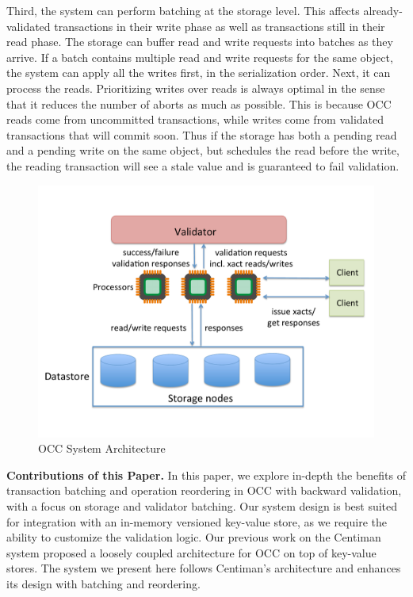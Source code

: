 Third, the system can perform batching at the storage level. This affects already-validated transactions in their write phase as well as transactions still in their read phase. The storage can buffer read and write requests into batches as they arrive. If a batch contains multiple read and write requests for the same object, the system can apply all the writes first, in the serialization order. Next, it can process the reads. Prioritizing writes over reads is always optimal in the sense that it reduces the number of aborts as much as possible. This is because OCC reads come from uncommitted transactions, while writes come from validated transactions that will commit soon. Thus if the storage has both a pending read and a pending write on the same object, but schedules the read before the write, the reading transaction will see a stale value and is guaranteed to fail validation. 


\begin{figure}[t]
 \centering
 \includegraphics[width=0.9\columnwidth]{figures/OCCArchitecture.pdf}
 \vspace{-.5em}
 \caption{OCC System Architecture}
 \label{fig:occ_arch}
\end{figure}


{\bf Contributions of this Paper.}
In this paper, we explore in-depth the benefits of transaction batching and operation reordering in OCC with backward validation, with a focus on storage and validator batching. Our system design is best suited for integration with an in-memory versioned key-value store, as we require the ability to customize the validation logic. Our previous work on the Centiman system\cite{ding2015centiman} proposed a loosely coupled architecture for OCC on top of key-value stores. The system we present here follows Centiman's architecture and enhances its design with batching and reordering.

